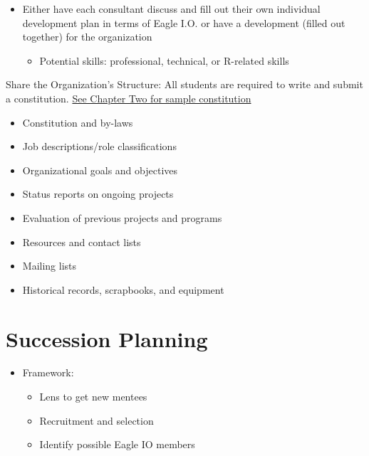 \documentclass[
]{book}
\providecommand{\tightlist}{%
  \setlength{\itemsep}{0pt}\setlength{\parskip}{0pt}}
\begin{document}
\begin{itemize}
\tightlist
\item
  Either have each consultant discuss and fill out their own individual development plan in terms of Eagle I.O. or have a development (filled out together) for the organization

  \begin{itemize}
  \tightlist
  \item
    Potential skills: professional, technical, or R-related skills
  \end{itemize}
\end{itemize}

Share the Organization's Structure: All students are required to write and submit a constitution. \href{https://www.utdallas.edu/soc/manual/04/\#leadership}{See Chapter Two for sample constitution}

\begin{itemize}
\tightlist
\item
  Constitution and by-laws
\item
  Job descriptions/role classifications
\item
  Organizational goals and objectives
\item
  Status reports on ongoing projects
\item
  Evaluation of previous projects and programs
\item
  Resources and contact lists
\item
  Mailing lists
\item
  Historical records, scrapbooks, and equipment
\end{itemize}

\hypertarget{succession-planning}{%
\chapter{Succession Planning}\label{succession-planning}}

\begin{itemize}
\tightlist
\item
  Framework:

  \begin{itemize}
  \tightlist
  \item
    Lens to get new mentees
  \item
    Recruitment and selection
  \item
    Identify possible Eagle IO members
  \end{itemize}
\end{itemize}
\end{document}

